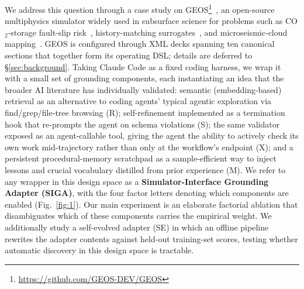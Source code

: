 \documentclass{article}
\begin{document}
We address this question through a case study on GEOS\footnote{\url{https://github.com/GEOS-DEV/GEOS}}~\citep{geos2024}, an open-source multiphysics simulator widely used in subsurface science for problems such as CO$_2$-storage fault-slip risk~\citep{he2026faultslip}, history-matching surrogates~\citep{han2024accelerated}, and microseismic-cloud mapping~\citep{glubokovskikh2023microseismic}. GEOS is configured through XML decks spanning ten canonical sections that together form its operating DSL; details are deferred to \S\ref{sec:background}. Taking Claude Code as a fixed coding harness, we wrap it with a small set of grounding components, each instantiating an idea that the broader AI literature has individually validated: semantic (embedding-based) retrieval as an alternative to coding agents' typical agentic exploration via find/grep/file-tree browsing (R); self-refinement implemented as a termination hook that re-prompts the agent on schema violations (S); the same validator exposed as an agent-callable tool, giving the agent the ability to actively check its own work mid-trajectory rather than only at the workflow's endpoint (X); and a persistent procedural-memory scratchpad as a sample-efficient way to inject lessons and crucial vocabulary distilled from prior experience (M). We refer to any wrapper in this design space as a \textbf{Simulator-Interface Grounding Adapter (SIGA)}, with the four factor letters denoting which components are enabled (Fig.~\ref{fig:1}). Our main experiment is an elaborate factorial ablation that disambiguates which of these components carries the empirical weight. We additionally study a self-evolved adapter (SE) in which an offline pipeline rewrites the adapter contents against held-out training-set scores, testing whether automatic discovery in this design space is tractable.
\end{document}
